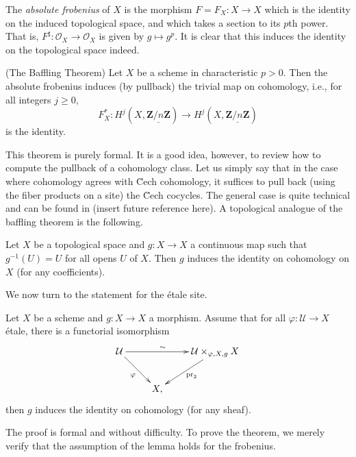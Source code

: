 \begin{definition}
\label{definition-absolute-frobenius}
The {\it absolute frobenius} of $X$ is the morphism $F = F_X : X \to X$ which
is the identity on the induced topological space, and which takes a section to
its $p$th power. That is, $F^\sharp : \mathcal{O}_X \to \mathcal{O}_X$ is given
by $g \mapsto g^p$. It is clear that this induces the identity on the
topological space indeed.
\end{definition}

\begin{theorem}
\label{theorem-baffling}
(The Baffling Theorem)
Let $X$ be a scheme in characteristic $p>0$. Then the absolute frobenius
induces (by pullback) the trivial map on cohomology, i.e., for all
integers $j\geq 0$,
$$
F_X^* : H^j (X, \underline{\mathbf{Z}/n\mathbf{Z}}) \longrightarrow H^j (X,
\underline{\mathbf{Z}/n\mathbf{Z}})
$$
is the identity.
\end{theorem}

\noindent
This theorem is purely formal. It is a good idea, however, to review how to
compute the pullback of a cohomology class. Let us simply say that in the case
where cohomology agrees with \u Cech cohomology, it suffices to pull back
(using the fiber products on a site) the \u Cech cocycles. The general case is
quite technical and can be found in (insert future reference here). A
topological analogue of the baffling theorem is the following.

\begin{exercise}
\label{exercise-baffling}
Let $X$ be a topological space and $g : X \to X$ a continuous map such that
$g^{-1}(U) = U$ for all opens $U$ of $X$. Then $g$ induces the identity on
cohomology on $X$ (for any coefficients).
\end{exercise}

\noindent
We now turn to the statement for the \'etale site.

\begin{lemma}
\label{lemma-baffling}
Let $X$ be a scheme and $g : X \to X$ a morphism. Assume that for all $\varphi:
\mathcal{U} \to X$ \'etale, there is a functorial isomorphism
$$
\xymatrix{
\mathcal{U} \ar_{\varphi}[rd] \ar^{\sim \quad}[rr] && {\mathcal{U}
\times_{\varphi, X,g} X} \ar^{\text{pr}_2}[ld]\\
& X,
}
$$
then $g$ induces the identity on cohomology (for any sheaf).
\end{lemma}

\noindent
The proof is formal and without difficulty. To prove the theorem, we merely
verify that the assumption of the lemma holds for the frobenius.


